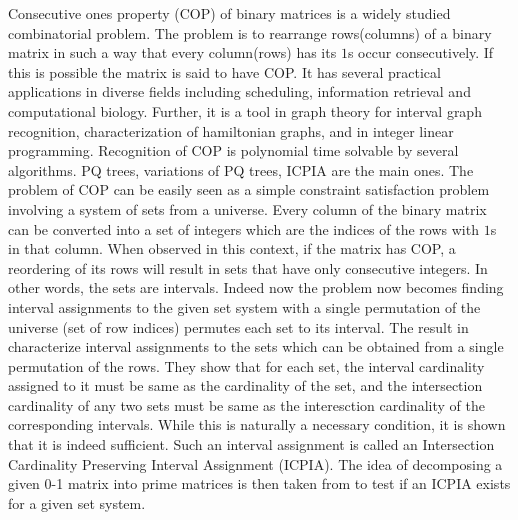 \documentclass{llncs}
\begin{document}
\noindent
Consecutive ones property (COP) of binary matrices is a widely studied
combinatorial problem. The problem is to rearrange rows(columns) of a
binary matrix in such a way that every column(rows) has its $1$s occur
consecutively. If this is possible the matrix is said to have COP.  It
has several practical applications in diverse fields including
scheduling\cite{hl06}, information retrieval\cite{k77} and computational biology\cite{abh98}. 
Further, it is a tool in graph theory\cite{mcg04} for  interval graph recognition, characterization of hamiltonian graphs, and in integer linear
programming\cite{ht02,hl06}. 
Recognition of COP is polynomial time
solvable by several algorithms. PQ trees\cite{bl76}, variations of PQ
trees\cite{mm09,wlh01,wlh02,mcc04}, ICPIA\cite{nsnrs09} are the main
ones. 
\noindent
The problem of COP can be easily seen as a 
simple constraint satisfaction problem involving a system of sets from
a universe. Every column of the binary matrix can be converted into a
set of integers which are the indices of the rows with $1$s in that
column. When observed in this context, if the matrix has COP, a
reordering of its rows will result in sets that have only consecutive
integers. In other words, the sets are intervals. Indeed now the
problem now becomes finding interval assignments to the given set
system \cite{nsnrs09} with a single permutation of the universe (set
of row
indices) permutes each set to its interval. The  result in \cite{nsnrs09} characterize interval assignments
to the sets which can be obtained from a single permutation of the rows.  They show that 
for each set, the interval cardinality assigned to it must be same as the cardinality of the set, and the
intersection cardinality of any two sets must be same as the interesction cardinality of the corresponding intervals.
While this is naturally a necessary condition, it is shown that it is indeed sufficient.  Such an interval assignment
is called an Intersection Cardinality Preserving Interval Assignment (ICPIA).  The idea of decomposing a given 0-1
matrix into prime matrices is then taken from \cite{wlh02} to test if an ICPIA exists for a given set system.  
\end{document}
